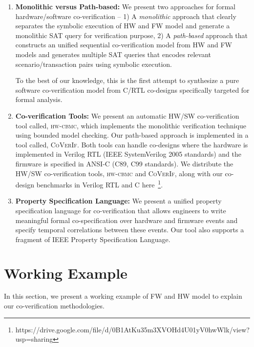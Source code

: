 \documentclass[sigconf]{acmart}
\newcommand{\tool}[1]{\textsc{#1}\xspace}
\newcommand{\hwcbmcv}{\tool{hw-cbmc}}
\newcommand{\verifox}{\tool{CoVerIf}}
\begin{document}
\begin{enumerate}
  
  \item \textbf{Monolithic versus Path-based:} We present two approaches for formal hardware/software co-verification
    -- 1) A \emph{monolithic} approach that clearly separates the symbolic
    execution of HW and FW model and generate a monolithic SAT query for 
    verification purpose, 2) A \emph{path-based} approach that constructs
    an unified sequential co-verification model from HW and FW models and
    generates multiple SAT queries that encodes relevant scenario/transaction 
    pairs using symbolic execution.  
    
    To the best of our knowledge, this is the first attempt to synthesize a pure 
    software co-verification model from C/RTL co-designs specifically targeted 
    for formal analysis.   
  
  \item \textbf{Co-verification Tools:} We present an automatic HW/SW co-verification 
    tool called, \hwcbmcv, which implements the monolithic verification technique 
    using bounded model checking.  Our path-based approach is implemented in a tool 
    called, \verifox. Both tools can handle co-designs where the hardware is 
    implemented in Verilog RTL (IEEE SystemVerilog 2005 standards) and the firmware is  
    specified in ANSI-C (C89, C99 standards).  We distribute the HW/SW 
    co-verification tools, \hwcbmcv and \verifox, along with our co-design 
    benchmarks in Verilog RTL and C 
    here~\footnote{https://drive.google.com/file/d/0B1AtKu35m3XVOHd4U01yV0hwWlk/view?usp=sharing}.

  \item \textbf{Property Specification Language:} We present a unified property
    specification language for co-verification that allows engineers to write meaningful 
     formal co-specification over hardware and firmware events and specify
     temporal correlations between these events.  Our tool also supports a
     fragment of IEEE Property Specification Language. 
     
    
\end{enumerate}
%
\section{Working Example}
In this section, we present a working example of FW and HW model to explain our 
co-verification methodologies.  
\end{document}

